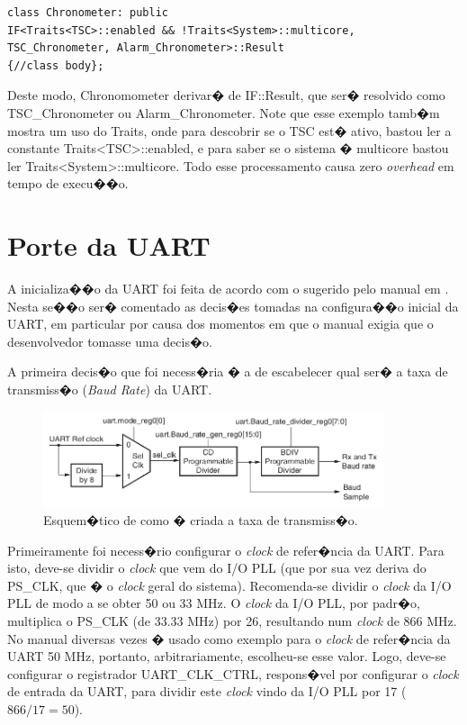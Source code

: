 \documentclass{ufscThesis/ufscThesis} %
\begin{document}
\begin{verbatim}
class Chronometer: public
IF<Traits<TSC>::enabled && !Traits<System>::multicore,
TSC_Chronometer, Alarm_Chronometer>::Result
{//class body};
\end{verbatim}

Deste modo, Chronomometer derivar� de IF::Result, que ser� resolvido como TSC\_Chronometer ou Alarm\_Chronometer. Note que esse exemplo tamb�m mostra um uso do Traits, onde para descobrir se o TSC est� ativo, bastou ler a constante Traits<TSC>::enabled, e para saber se o sistema � multicore bastou ler Traits<System>::multicore. Todo esse processamento causa zero \emph{overhead} em tempo de execu��o.

\section{Porte da UART}

A inicializa��o da UART foi feita de acordo com o sugerido pelo manual em \cite[p.~554]{ug585}. Nesta se��o ser� comentado as decis�es tomadas na configura��o inicial da UART, em particular por causa dos momentos em que o manual exigia que o desenvolvedor tomasse uma decis�o.

A primeira decis�o que foi necess�ria � a de escabelecer qual ser� a taxa de transmiss�o (\emph{Baud Rate}) da UART. 

\begin{figure}[ht!]
    \centering
    \includegraphics[width=10cm]{figuras/uart_board_rate}
    \caption{Esquem�tico de como � criada a taxa de transmiss�o.}
	\label{fig:uart}
\end{figure}

Primeiramente foi necess�rio configurar o \emph{clock} de refer�ncia da UART. Para isto, deve-se dividir o \emph{clock} que vem do I/O PLL (que por sua vez deriva do PS\_CLK, que � o \emph{clock} geral do sistema). Recomenda-se dividir o \emph{clock} da I/O PLL de modo a se obter 50 ou 33 MHz.
O \emph{clock} da I/O PLL, por padr�o, multiplica o PS\_CLK (de 33.33 MHz) por 26, resultando num \emph{clock} de 866 MHz.
No manual diversas vezes � usado como exemplo para o \emph{clock} de refer�ncia da UART 50 MHz, portanto, arbitrariamente, escolheu-se esse valor. Logo, deve-se configurar o registrador UART\_CLK\_CTRL, respons�vel por configurar o \emph{clock} de entrada da UART, para dividir este \emph{clock} vindo da I/O PLL por 17 ($866/17 = 50$).
\end{document}

